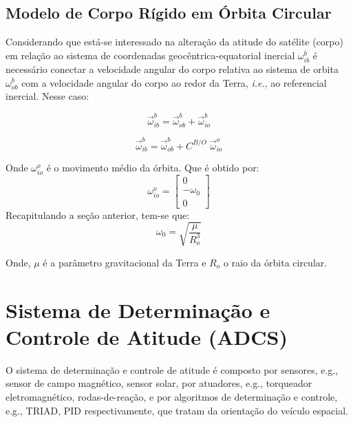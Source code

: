 \subsection{Modelo de Corpo Rígido em Órbita Circular}\label{sec:3.1.3.3}

Considerando que está-se interessado na alteração da atitude do satélite (corpo) em relação ao sistema de coordenadas geocêntrica-equatorial inercial $\omega^b_{ib}$ é necessário conectar a velocidade angular do corpo relativa ao sistema de orbita $\omega^b_{ob}$ com a velocidade angular do corpo ao redor da Terra, \textit{i.e.}, ao referencial inercial. Nesse caso:

\begin{equation}
\vec{\omega}^b_{ib}=\vec{\omega}^b_{ob}+\vec{\omega}^b_{io}
\end{equation}

\begin{equation}
\vec{\omega}^b_{ib}=\vec{\omega}^b_{ob}+C^{B/O}\;\vec{\omega}^o_{io}
\end{equation}

Onde \begin{math}\omega^o_{io}\end{math} é o movimento médio da órbita. Que é obtido por:
\begin{equation}\omega^o_{io} =\begin{bmatrix}0\\-\omega_0\\0
\end{bmatrix}\end{equation}Recapitulando a seção anterior, tem-se que:
\begin{equation}\omega_0=\sqrt{\frac{\mu}{R_o^3}}\end{equation}

Onde, $\mu$ é a parâmetro gravitacional da Terra e $R_o$ o raio da órbita circular.


\section{Sistema de Determinação e Controle de Atitude (ADCS)}\label{sec:3.1.4}

O sistema de determinação e controle de atitude é composto por sensores, {e.g.}, sensor de campo magnético, sensor solar, por atuadores, {e.g.}, torqueador eletromagnético, rodas-de-reação, e por algoritmos de determinação e controle, {e.g.}, TRIAD, PID respectivamente, que tratam da orientação do veículo espacial.


